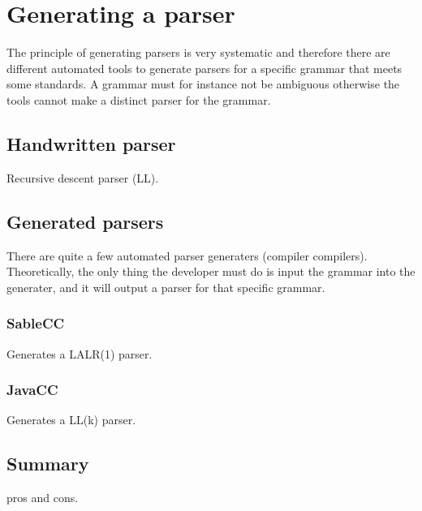 \section{Generating a parser}
The principle of generating parsers is very systematic and therefore there are different automated tools to generate parsers for a specific grammar that meets some standards. A grammar must for instance not be ambiguous otherwise the tools cannot make a distinct parser for the grammar. 

\subsection{Handwritten parser}
Recursive descent parser (LL).

\subsection{Generated parsers}
There are quite a few automated parser generaters (compiler compilers). Theoretically, the only thing the developer must do is input the grammar into the generater, and it will output a parser for that specific grammar.

\subsubsection{SableCC}
Generates a LALR(1) parser.

\subsubsection{JavaCC}
Generates a LL(k) parser.

\subsection{Summary}
pros and cons. 